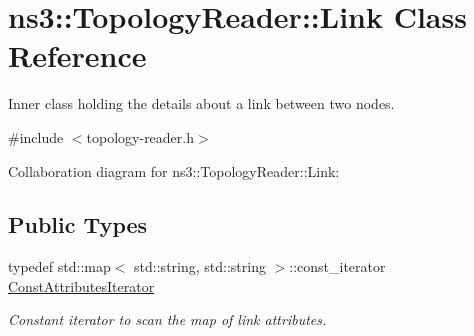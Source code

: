 \hypertarget{classns3_1_1TopologyReader_1_1Link}{}\section{ns3\+:\+:Topology\+Reader\+:\+:Link Class Reference}
\label{classns3_1_1TopologyReader_1_1Link}


Inner class holding the details about a link between two nodes.  




{\ttfamily \#include $<$topology-\/reader.\+h$>$}



Collaboration diagram for ns3\+:\+:Topology\+Reader\+:\+:Link\+:
\subsection*{Public Types}
\begin{DoxyCompactItemize}
\item 
typedef std\+::map$<$ std\+::string, std\+::string $>$\+::const\+\_\+iterator \hyperlink{classns3_1_1TopologyReader_1_1Link_a44b7c023b81df04836df21e9f577b3a3}{Const\+Attributes\+Iterator}
\begin{DoxyCompactList}\small\item\em Constant iterator to scan the map of link attributes. \end{DoxyCompactList}\end{DoxyCompactItemize}
